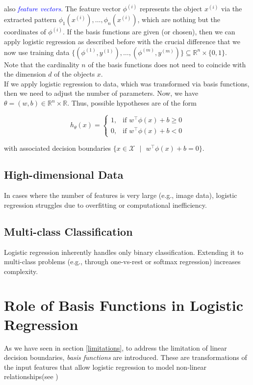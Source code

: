 also \textcolor{blue}{\emph{feature vectors}}. The feature vector $\phi^{(i)}$ represents the object $x^{(i)}$ via the extracted pattern $\phi_1(x^{(i)}), \dots, \phi_n(x^{(i)})$, which are nothing but the coordinates of $\phi^{(i)}$. If the basis functions are given (or chosen), then we can apply logistic regression as described before with the crucial
difference that we now use training data $\{(\phi^{(1)}, y^{(1)}), \dots, (\phi^{(m)}, y^{(m)}) \} \subseteq \mathbb{R}^n \times \{0, 1\}$.\\

Note that the cardinality $n$ of the basis functions does not need to coincide with the dimension $d$ of the objects $x$.\\

If we apply logistic regression to data, which was transformed via basis functions, then we need to adjust the number of parameters. Now, we have $\theta = (w, b) \in \mathbb{R}^n \times \mathbb{R}$. Thus, possible hypotheses are of the form

\begin{equation}
    h_{\theta}(x) =
    \begin{cases} 
        1, & \text{if } w^ \top \phi(x) + b \geq 0 \\
        0, & \text{if } w^ \top \phi(x) + b < 0
    \end{cases}
    \label{eqn:19}
\end{equation}

with associated decision boundaries $\{x \in \mathcal{X} \text{ }|\text{ }w^\top \phi(x) +b =0 \}$.

\subsection{High-dimensional Data}
In cases where the number of features is very large (e.g., image data), logistic regression struggles due to overfitting or computational inefficiency.

\subsection{Multi-class Classification}
Logistic regression inherently handles only binary classification. Extending it to multi-class problems (e.g., through one-vs-rest or softmax regression) increases complexity.


\section{Role of Basis Functions in Logistic Regression}
As we have seen in section \ref{limitations}, to address the limitation of linear decision boundaries, \emph{basis functions} are introduced. These are transformations of the input features that allow logistic regression to model non-linear relationships(see \cite[chapter 4.3.2]{bishop2006pattern})\\

